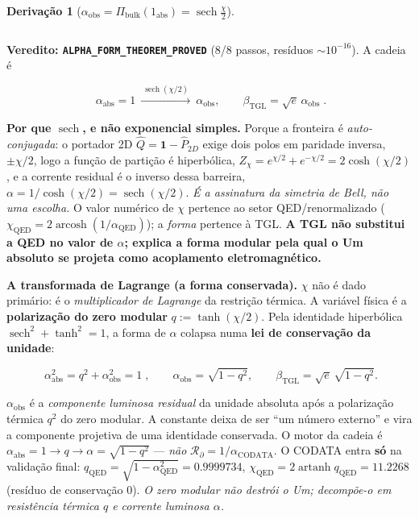 \documentclass[11pt]{article}
\newcommand{\bTGL}{\beta_{\mathrm{TGL}}}\newcommand{\Msun}{M_{\odot}}\newcommand{\TGL}{\mathrm{TGL}}
\theoremstyle{definition}\newtheorem{deriv}{Derivação}
\begin{document}
\begin{deriv}[$\alpha_{\mathrm{obs}}=\Pi_{\mathrm{bulk}}(1_{\mathrm{abs}})=\operatorname{sech}\tfrac\chi2$]
\begin{center}
\begin{tabular}{p{} l}
\hline\end{tabular}\end{center}

\textbf{Veredito: \texttt{ALPHA\_FORM\_THEOREM\_PROVED}} (8/8 passos, resíduos $\sim10^{-16}$). A cadeia é

\begin{equation}\boxed{\;\alpha_{\mathrm{abs}}=1\ \xrightarrow{\ \operatorname{sech}(\chi/2)\ }\ \alpha_{\mathrm{obs}},\qquad \bTGL=\sqrt e\,\alpha_{\mathrm{obs}}\;}.\end{equation}

\textbf{Por que $\operatorname{sech}$, e não exponencial simples.} Porque a fronteira é \emph{auto-conjugada}: o portador 2D $\hat Q=\mathbf 1-\hat P_{2D}$ exige dois polos em paridade inversa, $\pm\chi/2$, logo a função de partição é hiperbólica, $Z_\chi=e^{\chi/2}+e^{-\chi/2}=2\cosh(\chi/2)$, e a corrente residual é o inverso dessa barreira, $\alpha=1/\cosh(\chi/2)=\operatorname{sech}(\chi/2)$. \emph{É a assinatura da simetria de Bell, não uma escolha.} O valor numérico de $\chi$ pertence ao setor QED/renormalizado ($\chi_{\mathrm{QED}}=2\operatorname{arcosh}(1/\alpha_{\mathrm{QED}})$); a \emph{forma} pertence à TGL. \textbf{A TGL não substitui a QED no valor de $\alpha$; explica a forma modular pela qual o Um absoluto se projeta como acoplamento eletromagnético.}

\textbf{A transformada de Lagrange (a forma conservada).} $\chi$ não é dado primário: é o \emph{multiplicador de Lagrange} da restrição térmica. A variável física é a \textbf{polarização do zero modular} $q:=\tanh(\chi/2)$. Pela identidade hiperbólica $\operatorname{sech}^2+\tanh^2=1$, a forma de $\alpha$ colapsa numa \textbf{lei de conservação da unidade}:

\begin{equation}\boxed{\;\alpha_{\mathrm{abs}}^2=q^2+\alpha_{\mathrm{obs}}^2=1\;},\qquad \alpha_{\mathrm{obs}}=\sqrt{1-q^2},\qquad \bTGL=\sqrt e\,\sqrt{1-q^2}.\end{equation}

$\alpha_{\mathrm{obs}}$ é a \emph{componente luminosa residual} da unidade absoluta após a polarização térmica $q^2$ do zero modular. A constante deixa de ser ``um número externo'' e vira a componente projetiva de uma identidade conservada. O motor da cadeia é $\alpha_{\mathrm{abs}}=1\to q\to\alpha=\sqrt{1-q^2}$ --- \emph{não} $\mathcal R_\partial=1/\alpha_{\mathrm{CODATA}}$. O CODATA entra \textbf{só} na validação final: $q_{\mathrm{QED}}=\sqrt{1-\alpha_{\mathrm{QED}}^2}=0.9999734$, $\chi_{\mathrm{QED}}=2\operatorname{artanh}q_{\mathrm{QED}}=11.2268$ (resíduo de conservação $0$). \emph{O zero modular não destrói o Um; decompõe-o em resistência térmica $q$ e corrente luminosa $\alpha$.}\end{deriv}
\end{document}
